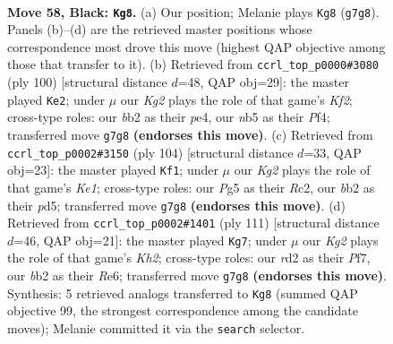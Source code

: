 \documentclass[11pt]{article}
\begin{document}
\clearpage

\begin{figure}[p]\centering
\begin{subfigure}{0.46\textwidth}\centering
\resizebox{\linewidth}{!}{%
\newchessgame
\chessboard[
  setfen={8/4p1k1/npr4p/pN4p1/P1p2P2/2P3K1/1B1R4/8 b - - 0 58},
  showmover=false,
  pgfstyle=straightmove, color=movearrow, markmove={g7-g8}
]}
\caption{}
\end{subfigure}\hfill
\begin{subfigure}{0.46\textwidth}\centering
\resizebox{\linewidth}{!}{%
\newchessgame
\chessboard[
  setfen={8/p1r2k2/R1P2p2/5p1p/P3pP1P/6P1/5K2/8 w - - 9 51},
  showmover=false,
  pgfstyle=straightmove, color=movearrow, markmove={f2-e2}
]}
\caption{}
\end{subfigure}
\\[4pt]
\begin{subfigure}{0.46\textwidth}\centering
\resizebox{\linewidth}{!}{%
\newchessgame
\chessboard[
  setfen={8/3k4/2n2p2/1r1p1Np1/p2P2P1/P7/1PR2P2/4K3 w - - 20 53},
  showmover=false,
  pgfstyle=straightmove, color=movearrow, markmove={e1-f1}
]}
\caption{}
\end{subfigure}\hfill
\begin{subfigure}{0.46\textwidth}\centering
\resizebox{\linewidth}{!}{%
\newchessgame
\chessboard[
  setfen={8/5p1k/1p2r2p/6p1/P2Rp1P1/4P3/5PPK/8 b - - 16 56},
  showmover=false,
  pgfstyle=straightmove, color=movearrow, markmove={h7-g7}
]}
\caption{}
\end{subfigure}
\caption{\textbf{Move 58, Black: \texttt{Kg8}.} (a) Our position; Melanie plays \texttt{Kg8} (\texttt{g7g8}). Panels (b)--(d) are the retrieved master positions whose correspondence most drove this move (highest QAP objective among those that transfer to it). (b) Retrieved from \texttt{ccrl\_top\_p0000\#3080} (ply 100) [structural distance $d$=48, QAP obj=29]: the master played \texttt{Ke2}; under $\mu$ our \emph{Kg2} plays the role of that game's \emph{Kf2}; cross-type roles: our \emph{b}b2 as their \emph{p}e4, our \emph{n}b5 as their \emph{P}f4; transferred move \texttt{g7g8} \textbf{(endorses this move)}. (c) Retrieved from \texttt{ccrl\_top\_p0002\#3150} (ply 104) [structural distance $d$=33, QAP obj=23]: the master played \texttt{Kf1}; under $\mu$ our \emph{Kg2} plays the role of that game's \emph{Ke1}; cross-type roles: our \emph{P}g5 as their \emph{R}c2, our \emph{b}b2 as their \emph{p}d5; transferred move \texttt{g7g8} \textbf{(endorses this move)}. (d) Retrieved from \texttt{ccrl\_top\_p0002\#1401} (ply 111) [structural distance $d$=46, QAP obj=21]: the master played \texttt{Kg7}; under $\mu$ our \emph{Kg2} plays the role of that game's \emph{Kh2}; cross-type roles: our \emph{r}d2 as their \emph{P}f7, our \emph{b}b2 as their \emph{R}e6; transferred move \texttt{g7g8} \textbf{(endorses this move)}. Synthesis: 5 retrieved analogs transferred to \texttt{Kg8} (summed QAP objective 99, the strongest correspondence among the candidate moves); Melanie committed it via the \texttt{search} selector.}
\label{fig:thought-m115}
\end{figure}
\end{document}
